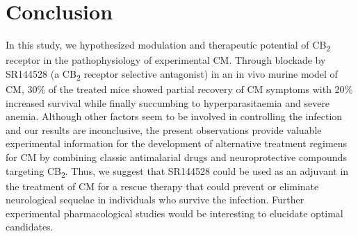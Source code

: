 \documentclass[empirical, authordate]{jote-new-article}
\begin{document}
\section{Conclusion}

In this study, we hypothesized modulation and therapeutic potential of CB\textsubscript{2} receptor in the pathophysiology of experimental CM. Through blockade by SR144528 (a CB\textsubscript{2} receptor selective antagonist) in an in vivo murine model of CM, 30\% of the treated mice showed partial recovery of CM symptoms with 20\% increased survival while finally succumbing to hyperparasitaemia and severe anemia. Although other factors seem to be involved in controlling the infection and our results are inconclusive, the present observations provide valuable experimental information for the development of alternative treatment regimens for CM by combining classic antimalarial drugs and neuroprotective compounds targeting CB\textsubscript{2}. Thus, we suggest that SR144528 could be used as an adjuvant in the treatment of CM for a rescue therapy that could prevent or eliminate neurological sequelae in individuals who survive the infection. Further experimental pharmacological studies would be interesting to elucidate optimal candidates.

\nocite{*}
\printbibliography
\end{document}
